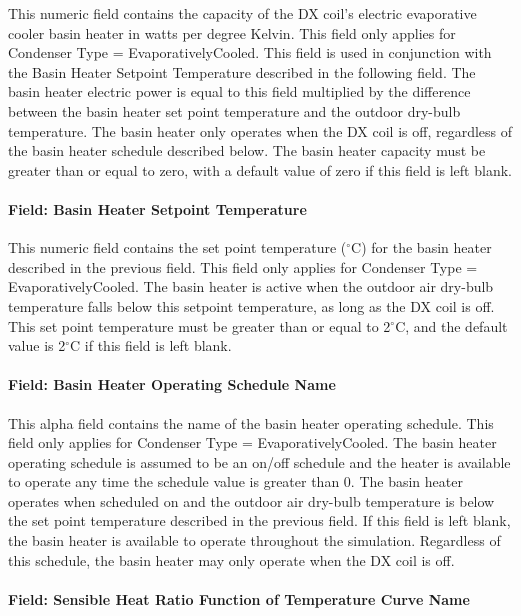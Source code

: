 This numeric field contains the capacity of the DX coil's electric evaporative cooler basin heater in watts per degree Kelvin. This field only applies for Condenser Type = EvaporativelyCooled. This field is used in conjunction with the Basin Heater Setpoint Temperature described in the following field. The basin heater electric power is equal to this field multiplied by the difference between the basin heater set point temperature and the outdoor dry-bulb temperature. The basin heater only operates when the DX coil is off, regardless of the basin heater schedule described below. The basin heater capacity must be greater than or equal to zero, with a default value of zero if this field is left blank.

\paragraph{Field: Basin Heater Setpoint Temperature}\label{field-basin-heater-setpoint-temperature-1-000}

This numeric field contains the set point temperature ($^\circ$C) for the basin heater described in the previous field. This field only applies for Condenser Type = EvaporativelyCooled. The basin heater is active when the outdoor air dry-bulb temperature falls below this setpoint temperature, as long as the DX coil is off. This set point temperature must be greater than or equal to 2$^\circ$C, and the default value is 2$^\circ$C if this field is left blank.

\paragraph{Field: Basin Heater Operating Schedule Name}\label{field-basin-heater-operating-schedule-name-1-000}

This alpha field contains the name of the basin heater operating schedule. This field only applies for Condenser Type = EvaporativelyCooled. The basin heater operating schedule is assumed to be an on/off schedule and the heater is available to operate any time the schedule value is greater than 0. The basin heater operates when scheduled on and the outdoor air dry-bulb temperature is below the set point temperature described in the previous field. If this field is left blank, the basin heater is available to operate throughout the simulation. Regardless of this schedule, the basin heater may only operate when the DX coil is off.

\paragraph{Field: Sensible Heat Ratio Function of Temperature Curve Name}\label{field-sensible-heat-ratio-function-of-temperature-curve-name-1}


